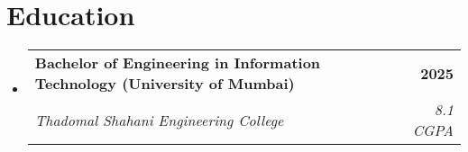 \documentclass[letterpaper,11pt]{article}
\makeatletter
\newcommand{\resumeSubheading}[4]{
  \vspace{-2pt}\item
    \begin{tabular*}{1.0\textwidth}[t]{l@{\extracolsep{\fill}}r}
      \textbf{#1} & \textbf{\small #2} \\
      \textit{\small#3} & \textit{\small #4} \\
    \end{tabular*}\vspace{-7pt}
}
\newcommand{\resumeSubHeadingListStart}{\begin{itemize}[leftmargin=0.0in, label={}]}
\newcommand{\resumeSubHeadingListEnd}{\end{itemize}}
\newcommand{\resumeItemListEnd}{\end{itemize}\vspace{-5pt}}
\makeatother
\begin{document}
          
\vspace{-10pt}

\section{Education}
\vspace{-5pt}
  \resumeSubHeadingListStart
    \resumeSubheading
      {Bachelor of Engineering in Information Technology (University of Mumbai)}{2025}{Thadomal Shahani Engineering College}
      {8.1 CGPA}
  \resumeSubHeadingListEnd
  \vspace{-12pt}
  

\end{document}
